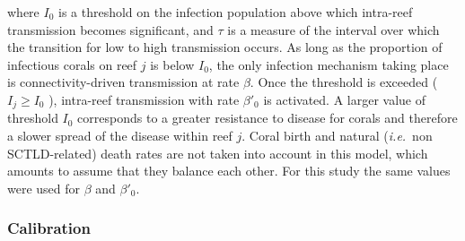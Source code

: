 \documentclass[utf8]{frontiersSCNS}
\newcommand{\ie}{{\it i.e.}\ }
\begin{document}
where $I_0$ is a threshold on the infection population above which intra-reef transmission becomes significant, and $\tau$ is a measure of the interval over which the transition for low to high transmission occurs. As long as the proportion of infectious corals on reef $j$ is below $I_0$, the only infection mechanism taking place is connectivity-driven transmission at rate $\beta$. Once the threshold is exceeded ( $I_j \geq I_0$ ), intra-reef transmission with rate $\beta'_0$ is activated. A larger value of threshold $I_0$ corresponds to a greater resistance to disease for corals and therefore a slower spread of the disease within reef $j$. Coral birth and natural (\ie non SCTLD-related) death rates are not taken into account in this model, which amounts to assume that they balance each other. For this study the same values were used for $\beta$ and $\beta'_0$.

\subsubsection{Calibration}
\end{document}
